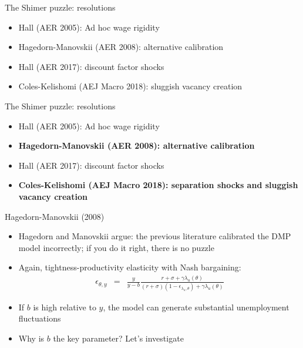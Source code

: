 \documentclass[9pt]{beamer}
\newcommand{\bit}{\begin{itemize}}
\newcommand{\eit}{\end{itemize}}
\begin{document}
\begin{frame}{The Shimer puzzle: resolutions}

\bit
\setlength\itemsep{1.5em}

\item Hall (AER 2005): Ad hoc wage rigidity

\item Hagedorn-Manovskii (AER 2008): alternative calibration

\item Hall (AER 2017): discount factor shocks

\item Coles-Kelishomi (AEJ Macro 2018): sluggish vacancy creation

\eit

\end{frame}


\begin{frame}{The Shimer puzzle: resolutions}

\bit
\setlength\itemsep{1.5em}

\item Hall (AER 2005): Ad hoc wage rigidity

\item \bf Hagedorn-Manovskii (AER 2008): alternative calibration \normalfont

\item Hall (AER 2017): discount factor shocks

\item \bf Coles-Kelishomi (AEJ Macro 2018): separation shocks and sluggish vacancy creation \normalfont

\eit

\end{frame}


\begin{frame}{Hagedorn-Manovskii (2008)}

\bit
\setlength\itemsep{2em}

\item Hagedorn and Manovskii argue: the previous literature calibrated the DMP model incorrectly; if you do it right, there is no puzzle

\item Again, tightness-productivity elasticity with Nash bargaining:
\begin{eqnarray}
\epsilon_{\theta, y} &=& \frac{y}{y-b} \frac{r+ \sigma + \gamma \lambda_u(\theta)}{(r + \sigma)(1-\epsilon_{\lambda_u,\theta}) + \gamma \lambda_u(\theta)} \nonumber
\end{eqnarray}

\item If $b$ is high relative to $y$, the model can generate substantial unemployment fluctuations

\item Why is $b$ the key parameter? Let's investigate

\eit
\end{frame}
\end{document}
